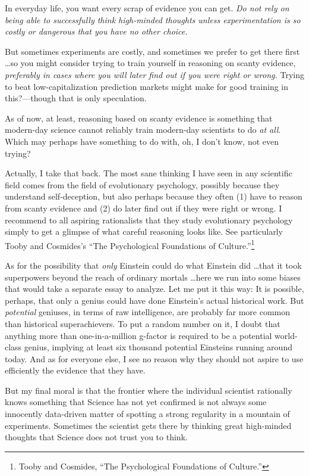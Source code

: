 {
 In everyday life, you want every scrap of evidence you can get.
\textit{Do not rely on being able to successfully think high-minded
thoughts unless experimentation is so costly or dangerous that you have
no other choice.}}

{
 But sometimes experiments are costly, and sometimes we prefer to
get there first \ldots so you might consider trying to train yourself in
reasoning on scanty evidence, \textit{preferably in cases where you
will later find out if you were right or wrong.} Trying to beat
low-capitalization prediction markets might make for good training in
this?---though that is only speculation.}

{
 As of now, at least, reasoning based on scanty evidence is
something that modern-day science cannot reliably train modern-day
scientists to do \textit{at all}. Which may perhaps have something to
do with, oh, I don't know, not even trying?}

{
 Actually, I take that back. The most sane thinking I have seen in
any scientific field comes from the field of evolutionary psychology,
possibly because they understand self-deception, but also perhaps
because they often (1) have to reason from scanty evidence and (2) do
later find out if they were right or wrong. I recommend to all aspiring
rationalists that they study evolutionary psychology simply to get a
glimpse of what careful reasoning looks like. See particularly Tooby
and Cosmides's ``The Psychological
Foundations of Culture.''\footnote{Tooby and Cosmides, ``The Psychological
Foundations of Culture.''}}

{
 As for the possibility that \textit{only} Einstein could do what
Einstein did \ldots that it took superpowers beyond the reach of
ordinary mortals \ldots here we run into some biases that would take a
separate essay to analyze. Let me put it this way: It is possible,
perhaps, that only a genius could have done Einstein's
actual historical work. But \textit{potential} geniuses, in terms of
raw intelligence, are probably far more common than historical
superachievers. To put a random number on it, I doubt that anything
more than one-in-a-million g-factor is required to be a potential
world-class genius, implying at least six thousand potential Einsteins
running around today. And as for everyone else, I see no reason why
they should not aspire to use efficiently the evidence that they have.}

{
 But my final moral is that the frontier where the individual
scientist rationally knows something that Science has not yet confirmed
is not always some innocently data-driven matter of spotting a strong
regularity in a mountain of experiments. Sometimes the scientist gets
there by thinking great high-minded thoughts that Science does not
trust you to think.}

